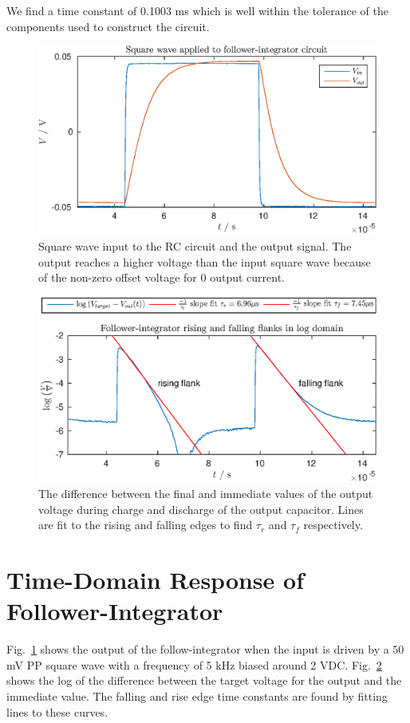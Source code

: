 We find a time constant of 0.1003 ms which is well within the tolerance of the components used to construct the circuit.
\begin{figure}[!htb]
    \center
    \includegraphics{ex2-step.eps}
    \caption{Square wave input to the RC circuit and the output signal. The output reaches a higher voltage than the input square wave
    because of the non-zero offset voltage for 0 output current.}
    \label{fig:ex2-1}
\end{figure}
\begin{figure}[!htb]
    \center
    \includegraphics{ex2-log.eps}
    \caption{The difference between the final and immediate values of the output voltage during charge and discharge of the output capacitor. 
    Lines are fit to the rising and falling edges to find \(\tau_r\) and \(\tau_f\) respectively.}
    \label{fig:ex2-2}
\end{figure}
\section{Time-Domain Response of Follower-Integrator}
Fig.~\ref{fig:ex2-1} shows the output of the follow-integrator when the input is driven by a 50 mV PP square wave with a frequency of 5 kHz biased around
2 VDC. Fig.~\ref{fig:ex2-2} shows the log of the difference between the target voltage for the output and the immediate value.
The falling and rise edge time constants are found by fitting lines to these curves.

